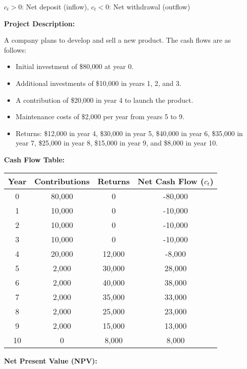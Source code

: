 \begin{comments}
    $c_t > 0$: Net deposit (inflow), 
    $c_t < 0$: Net withdrawal (outflow)
\end{comments}

\begin{example}

\textbf{Project Description:}

A company plans to develop and sell a new product. The cash flows are as follows:

\begin{itemize}
    \item Initial investment of \$80{,}000 at year 0.
    \item Additional investments of \$10{,}000 in years 1, 2, and 3.
    \item A contribution of \$20{,}000 in year 4 to launch the product.
    \item Maintenance costs of \$2{,}000 per year from years 5 to 9.
    \item Returns: \$12{,}000 in year 4, \$30{,}000 in year 5, \$40{,}000 in year 6, \$35{,}000 in year 7, \$25{,}000 in year 8, \$15{,}000 in year 9, and \$8{,}000 in year 10.
\end{itemize}

\textbf{Cash Flow Table:}

\begin{center}
\begin{tabular}{cccc}
\toprule
Year & Contributions & Returns & Net Cash Flow ($c_t$) \\
\midrule
0 & 80{,}000 & 0 & -80{,}000 \\
1 & 10{,}000 & 0 & -10{,}000 \\
2 & 10{,}000 & 0 & -10{,}000 \\
3 & 10{,}000 & 0 & -10{,}000 \\
4 & 20{,}000 & 12{,}000 & -8{,}000 \\
5 & 2{,}000 & 30{,}000 & 28{,}000 \\
6 & 2{,}000 & 40{,}000 & 38{,}000 \\
7 & 2{,}000 & 35{,}000 & 33{,}000 \\
8 & 2{,}000 & 25{,}000 & 23{,}000 \\
9 & 2{,}000 & 15{,}000 & 13{,}000 \\
10 & 0 & 8{,}000 & 8{,}000 \\
\bottomrule
\end{tabular}
\end{center}

\textbf{Net Present Value (NPV):}


\end{example}
